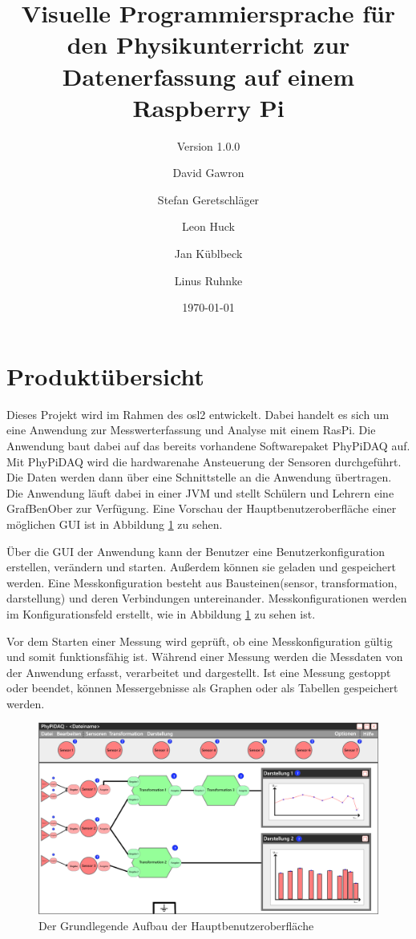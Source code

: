 \documentclass[parskip=full]{scrartcl}
\title{Visuelle Programmiersprache für den Physikunterricht zur Datenerfassung auf einem Raspberry Pi}
\subtitle{Version 1.0.0}
\author{David Gawron \and Stefan Geretschläger \and Leon Huck \and Jan Küblbeck \and Linus Ruhnke}
\date{\today}
\begin{document}
\maketitle

\clearpage
\tableofcontents 					%

\clearpage
\section{Produktübersicht} %

Dieses Projekt wird im Rahmen des \gls{osl2} entwickelt. Dabei handelt es sich um eine Anwendung zur Messwerterfassung und Analyse mit einem \gls{RasPi}. Die Anwendung baut dabei auf das bereits vorhandene Softwarepaket \gls{PhyPiDAQ} auf. Mit \gls{PhyPiDAQ} wird die hardwarenahe Ansteuerung der Sensoren durchgeführt. Die Daten werden dann über eine Schnittstelle an die Anwendung übertragen. Die Anwendung läuft dabei in einer \gls{JVM} und stellt Schülern und Lehrern eine \gls{GrafBenOber} zur Verfügung. Eine Vorschau der Hauptbenutzeroberfläche einer möglichen GUI ist in Abbildung \ref{GUI_Vorschau} zu sehen.


Über die GUI der Anwendung kann der Benutzer eine \gls{Benutzerkonfiguration} erstellen, verändern und starten. Außerdem können sie geladen und gespeichert werden. Eine Messkonfiguration besteht aus Bausteinen(\gls{sensor}, \gls{transformation}, \gls{darstellung}) und deren Verbindungen untereinander. Messkonfigurationen werden im Konfigurationsfeld erstellt, wie in Abbildung \ref{GUI_Vorschau} zu sehen ist.
 
Vor dem Starten einer Messung wird geprüft, ob eine Messkonfiguration gültig und somit funktionsfähig ist. Während einer Messung werden die Messdaten von der Anwendung erfasst, verarbeitet und dargestellt. Ist eine Messung gestoppt oder beendet, können Messergebnisse als Graphen oder als Tabellen gespeichert werden.


\begin{figure}[htbp]
	\begin{center}
		\includegraphics[width = 14cm]{Grafik/Konkreter-Anwendungsfall-Vorschau.png}
		\caption{Der Grundlegende Aufbau der Hauptbenutzeroberfläche}
		\label{GUI_Vorschau}
	\end{center}
\end{figure}
\end{document}
